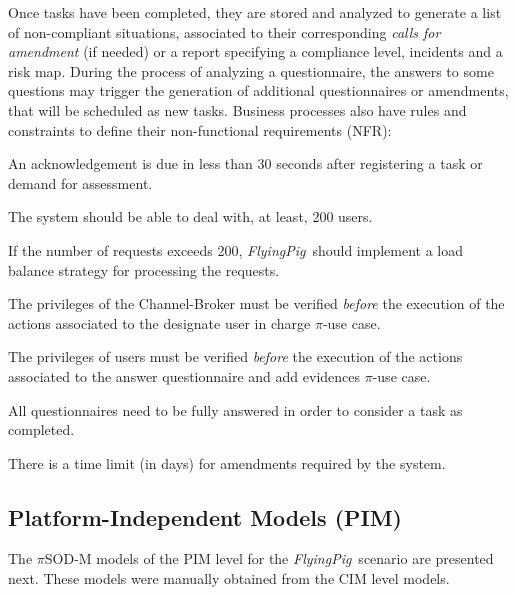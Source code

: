 \documentclass{singlecol-new}
\theoremstyle{TH}{
\newtheorem{lemma}{Lemma}
\newtheorem{theorem}[lemma]{Theorem}
\newtheorem{corrolary}[lemma]{Corrolary}
\newtheorem{conjecture}[lemma]{Conjecture}
\newtheorem{proposition}[lemma]{Proposition}
\newtheorem{claim}[lemma]{Claim}
\newtheorem{stheorem}[lemma]{Wrong Theorem}
\newtheorem{algorithm}{Algorithm}
}
\theoremstyle{THrm}{
\newtheorem{definition}{Definition}[section]
\newtheorem{question}{Question}[section]
\newtheorem{remark}{Remark}
\newtheorem{scheme}{Scheme}
}
\theoremstyle{THhit}{
\newtheorem{case}{Case}[section]
}
\theoremstyle{THhsl}{
\newtheorem{example}{Example}
}
\newcommand{\pisodm}[0]{$\pi$SOD-M\xspace}
\def\FlyingPig{\textsl{FlyingPig}\xspace}
\begin{document}
Once tasks have been completed, they are stored and analyzed to generate a list of non-compliant situations, associated to their corresponding \textit{calls for amendment} (if needed) or a report specifying a compliance level, incidents and a risk map.
During the process of analyzing a questionnaire, the answers to some questions may trigger the generation of additional questionnaires or amendments, that will be scheduled as new tasks.
Business processes also have rules and constraints to define their non-functional requirements (NFR):

\begin{compactenum}
\item An acknowledgement is due in less than 30 seconds after registering a task or demand for assessment.
\item The system should be able to deal with, at least, 200 users.
\item If the number of requests exceeds 200, \FlyingPig\ should implement a load balance strategy for processing the requests.
\item The privileges of the Channel-Broker must be verified \textit{before} the execution of the actions associated to the \textsf{designate user in charge} $\pi$-use case.
\item The privileges of users must be verified \textit{before} the execution of the actions associated to the \textsf{answer questionnaire and add evidences} $\pi$-use case.
\item All questionnaires need to be fully answered in order to consider a task as completed.
\item There is a time limit (in days) for amendments required by the system.
\end{compactenum}

\subsection{Platform-Independent Models (PIM)}

The \pisodm models of the PIM level  for the \FlyingPig\ scenario are presented next.
These models were manually obtained from the CIM level models.



\end{document}
